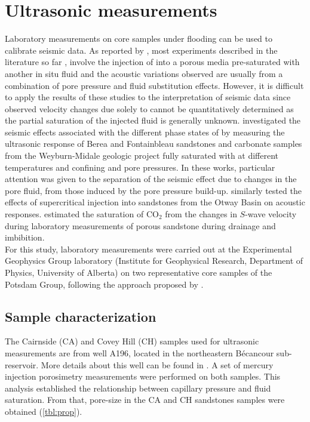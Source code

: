 \section{Ultrasonic measurements}
\label{sc:art_1_ultrasonic_measurements}
Laboratory measurements on core samples under  flooding can be used to
calibrate seismic data. As reported by \citet{Njiekak2013}, most experiments
described in the literature so far
\citep{Wang1989,Xue2005,Lei2009,Purcell2010,Shi2011,Ivanova2012}, involve the
injection of  into a porous media pre-saturated with another in situ
fluid and the acoustic variations observed are usually from a combination of
pore pressure and fluid substitution effects. However, it is difficult to apply
the results of these studies to the interpretation of seismic data since
observed velocity changes due solely to  cannot be quantitatively
determined as the  partial saturation of the injected fluid is generally
unknown. \citet{Yam2011b,Chowdhury2013,Njiekak2013} investigated the seismic
effects associated with the different phase states of  by measuring the
ultrasonic response of Berea and Fontainbleau sandstones and carbonate samples
from the Weyburn-Midale geologic project fully saturated with  at
different temperatures and confining and pore pressures. In these works,
particular attention was given to the separation of the seismic effect due to
changes in the pore fluid, from those induced by the pore pressure build-up.
\citet{Lebedev2013} similarly tested the effects of supercritical 
injection into sandstones from the Otway Basin on acoustic responses.
\citet{Kitamura2014} estimated the saturation of CO$_2$ from the changes in
$S$-wave velocity during laboratory measurements of porous sandstone during
drainage and imbibition.\\
For this study, laboratory measurements were carried out at the Experimental
Geophysics Group laboratory (Institute for Geophysical Research, Department of
Physics, University of Alberta) on two representative core samples of the
Potsdam Group, following the approach proposed by \citet{Schmitt2012}.
\subsection{Sample characterization}
The Cairnside (CA) and Covey Hill (CH) samples used for ultrasonic measurements
are from well A196, located in the northeastern Bé\-can\-cour sub-reservoir.
More details about this well can be found in \citet{TranNgoc2014}. A set of
mercury injection porosimetry measurements were performed on both samples. This
analysis established the relationship between capillary pressure and fluid
saturation. From that, pore-size in the CA and CH sandstones samples were
obtained (\cref{tbl:prop}).
